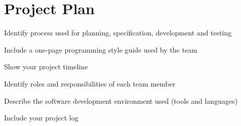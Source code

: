 \chapter{Project Plan}

Identify process used for planning, specification, development and testing

Include a one-page programming style guide used by the team

Show your project timeline

Identify roles and responsibilities of each team member

Describe the software development environment used (tools and languages)

Include your project log

